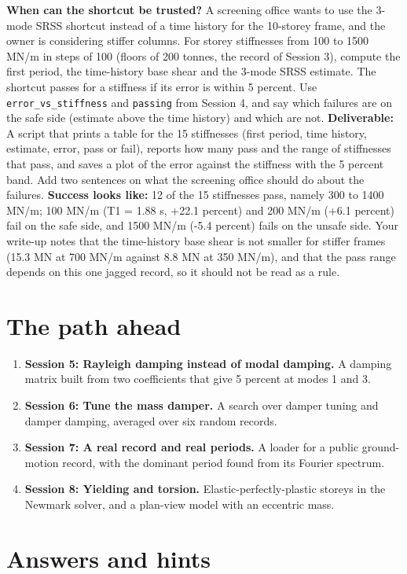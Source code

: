 \documentclass[11pt,a4paper]{article}
\begin{document}
\textbf{When can the shortcut be trusted?} A screening office wants to use the 3-mode SRSS shortcut instead of a time history for the 10-storey frame, and the owner is considering stiffer columns. For storey stiffnesses from 100 to 1500 MN/m in steps of 100 (floors of 200 tonnes, the record of Session 3), compute the first period, the time-history base shear and the 3-mode SRSS estimate. The shortcut passes for a stiffness if its error is within 5 percent. Use \texttt{error\_vs\_stiffness} and \texttt{passing} from Session 4, and say which failures are on the safe side (estimate above the time history) and which are not. \textbf{Deliverable:} A script that prints a table for the 15 stiffnesses (first period, time history, estimate, error, pass or fail), reports how many pass and the range of stiffnesses that pass, and saves a plot of the error against the stiffness with the 5 percent band. Add two sentences on what the screening office should do about the failures. \textbf{Success looks like:} 12 of the 15 stiffnesses pass, namely 300 to 1400 MN/m; 100 MN/m (T1 = 1.88 s, +22.1 percent) and 200 MN/m (+6.1 percent) fail on the safe side, and 1500 MN/m (-5.4 percent) fails on the unsafe side. Your write-up notes that the time-history base shear is not smaller for stiffer frames (15.3 MN at 700 MN/m against 8.8 MN at 350 MN/m), and that the pass range depends on this one jagged record, so it should not be read as a rule.

\section{The path ahead}
\begin{enumerate}[nosep]
\item \textbf{Session 5: Rayleigh damping instead of modal damping.} A damping matrix built from two coefficients that give 5 percent at modes 1 and 3.
\item \textbf{Session 6: Tune the mass damper.} A search over damper tuning and damper damping, averaged over six random records.
\item \textbf{Session 7: A real record and real periods.} A loader for a public ground-motion record, with the dominant period found from its Fourier spectrum.
\item \textbf{Session 8: Yielding and torsion.} Elastic-perfectly-plastic storeys in the Newmark solver, and a plan-view model with an eccentric mass.
\end{enumerate}

\section{Answers and hints}
\end{document}
